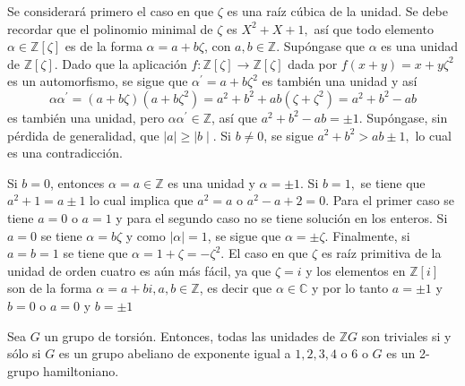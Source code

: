 \begin{proof*}
Se considerará primero el caso en que $\zeta$ es una raíz cúbica de la unidad. Se debe recordar que el polinomio minimal de $\zeta$ es $X^2 + X + 1,$ así que todo elemento $\alpha \in \mathds{Z}[\zeta]$ es de la forma $\alpha = a+b\zeta$, con $a,b \in \mathds{Z}$. Supóngase que $\alpha$ es una unidad de $\mathds{Z}[\zeta]$. Dado que la aplicación $f \colon \mathds{Z}[\zeta]\to \mathds{Z}[\zeta]$ dada por $f(x+y) = x+y\zeta^2$ es un automorfismo, se sigue que $\alpha^{'} = a + b\zeta^2$ es también una unidad y así \[ \alpha\alpha^{'} = (a + b\zeta)(a + b\zeta^2) = a^2 + b^2 + ab(\zeta  + \zeta^2) = a^2 + b^2 -ab \] es también una unidad, pero $\alpha\alpha^{'} \in \mathds{Z}$, así que $a^2 + b^2 -ab = \pm 1$. Supóngase, sin pérdida de generalidad, que $\mid a \mid \geq \mid b \mid$. Si $b \neq 0$, se sigue $a^2 + b^2 > ab \pm 1,$ lo cual es una contradicción. 

Si $b = 0$, entonces $\alpha = a \in \mathds{Z}$ es una unidad y $\alpha = \pm 1$. Si $b = 1,$ se tiene que $a^2 + 1 = a \pm 1$ lo cual implica que $a^2 = a$ o  $a^2-a+2 = 0$. Para el primer caso se tiene $a = 0$  o $a=1$ y para el segundo caso no se tiene solución en los enteros. Si $a=0$ se tiene $\alpha = b\zeta$ y como $\mid \alpha \mid = 1$, se sigue que $\alpha = \pm \zeta$. Finalmente, si $a = b = 1$ se tiene que $\alpha =1 + \zeta = -\zeta^2$.
El caso en que $\zeta$ es raíz primitiva de la unidad de orden cuatro es aún más fácil, ya que $\zeta = i$ y los elementos en $\mathds{Z}[i]$ son de la forma $\alpha = a + bi, a,b \in \mathds{Z}$, es decir que $\alpha \in \mathds{C}$ y por lo tanto $a = \pm 1$ y $b = 0$ o $a = 0$ y $b = \pm 1$
\end{proof*}
\begin{teorema}[Higman]\label{teo:Higman}
Sea $G$ un grupo de torsión. Entonces, todas las unidades de $\mathds{Z}G$ son triviales si y sólo si $G$ es un grupo abeliano de exponente igual a $1,2,3,4$ o $6$ o $G$ es un 2-grupo hamiltoniano. 
\end{teorema}
